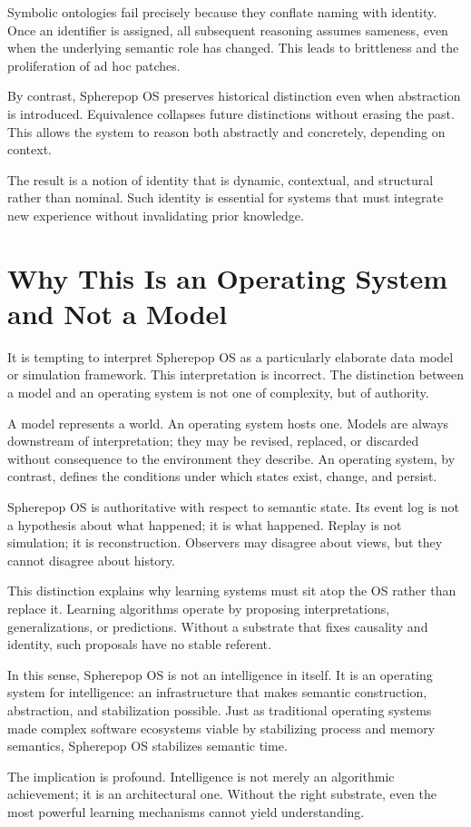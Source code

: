 \documentclass[11pt]{article}
\begin{document}
Symbolic ontologies fail precisely because they conflate naming with
identity. Once an identifier is assigned, all subsequent reasoning assumes
sameness, even when the underlying semantic role has changed. This leads
to brittleness and the proliferation of ad hoc patches.

By contrast, Spherepop OS preserves historical distinction even when
abstraction is introduced. Equivalence collapses future distinctions
without erasing the past. This allows the system to reason both abstractly
and concretely, depending on context.

The result is a notion of identity that is dynamic, contextual, and
structural rather than nominal. Such identity is essential for systems
that must integrate new experience without invalidating prior knowledge.

\section{Why This Is an Operating System and Not a Model}

It is tempting to interpret Spherepop OS as a particularly elaborate data
model or simulation framework. This interpretation is incorrect. The
distinction between a model and an operating system is not one of
complexity, but of authority.

A model represents a world. An operating system hosts one. Models are
always downstream of interpretation; they may be revised, replaced, or
discarded without consequence to the environment they describe. An
operating system, by contrast, defines the conditions under which states
exist, change, and persist.

Spherepop OS is authoritative with respect to semantic state. Its event log
is not a hypothesis about what happened; it is what happened. Replay is
not simulation; it is reconstruction. Observers may disagree about views,
but they cannot disagree about history.

This distinction explains why learning systems must sit atop the OS rather
than replace it. Learning algorithms operate by proposing interpretations,
generalizations, or predictions. Without a substrate that fixes causality
and identity, such proposals have no stable referent.

In this sense, Spherepop OS is not an intelligence in itself. It is an
operating system for intelligence: an infrastructure that makes semantic
construction, abstraction, and stabilization possible. Just as traditional
operating systems made complex software ecosystems viable by stabilizing
process and memory semantics, Spherepop OS stabilizes semantic time.

The implication is profound. Intelligence is not merely an algorithmic
achievement; it is an architectural one. Without the right substrate, even
the most powerful learning mechanisms cannot yield understanding.
\end{document}
